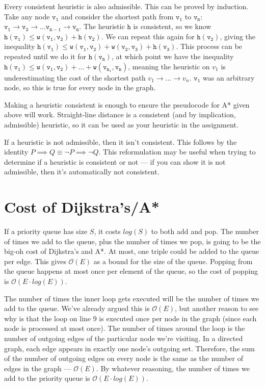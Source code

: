 \documentclass[a4paper,12pt]{article}
\newcommand{\kwa}[1]{\mathtt{#1}}
\begin{document}
Every consistent heuristic is also admissible. This can be proved by induction. Take any node $\kwa{v_1}$ and consider the shortest path from $\kwa{v_1}$ to $\kwa{v_n}$: $\kwa{v_1 \rightarrow v_2 \rightarrow ... v_{n-1} \rightarrow v_n}$. The heuristic $\kwa{h}$ is consistent, so we know $\kwa{h(v_1) \leq w(v_1, v_2) + h(v_2)}$. We can repeat this again for $\kwa{h(v_2)}$, giving the inequality $\kwa{h(v_1) \leq w(v_1, v_2) + w(v_2, v_3) + h(v_3)}$. This process can be repeated until we do it for $\kwa{h(v_n)}$, at which point we have the inequality $\kwa{h(v_1) \leq w(v_1, v_2) + ... + w(v_{n_1}, v_n)}$, meaning the heuristic on $v_1$ is underestimating the cost of the shortest path $v_1 \rightarrow ... \rightarrow v_n$. $\kwa{v_1}$ was an arbitrary node, so this is true for every node in the graph.

Making a heuristic consistent is enough to ensure the pseudocode for A* given above will work. Straight-line distance is a consistent (and by implication, admissible) heuristic, so it can be used as your heuristic in the assignment.

If a heuristic is not admissible, then it isn't consistent. This follows by the identity $P \implies Q \equiv \neg P \implies \neg Q$. This reformulation may be useful when trying to determine if a heuristic is consistent or not --- if you can show it is not admissible, then it's automatically not consistent.

\section{Cost of Dijkstra's/A*}

If a priority queue has size $S$, it costs $log(S)$ to both add and pop. The number of times we add to the queue, plus the number of times we pop, is going to be the big-oh cost of Dijkstra's and A*. At most, one triple could be added to the queue per edge. This gives $\mathcal{O}(E)$ as a bound for the size of the queue. Popping from the queue happens at most once per element of the queue, so the cost of popping is $\mathcal{O}(E \cdot log (E))$. 

The number of times the inner loop gets executed will be the number of times we add to the queue. We've already argued this is $\mathcal{O}(E)$, but another reason to see why is that the loop on line 9 is executed once per node in the graph (since each node is processed at most once). The number of times around the loop is the number of outgoing edges of the particular node we're visiting. In a directed graph, each edge appears in exactly one node's outgoing set. Therefore, the sum of the number of outgoing edges on every node is the same as the number of edges in the graph --- $\mathcal{O}(E)$. By whatever reasoning, the number of times we add to the priority queue is $\mathcal{O}(E \cdot log(E))$.
\end{document}
